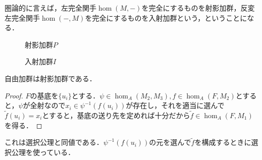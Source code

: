 圏論的に言えば，左完全関手$\hom(M,-)$を完全にするものを射影加群，反変左完全関手$\hom(-,M)$を完全にするものを入射加群という，ということになる．

\begin{minipage}{.45\hsize}
	\begin{figure}[H]
		\centering
		\caption{射影加群$P$}
	\end{figure}
\end{minipage}
\hfill
\begin{minipage}{.45\hsize}
	\begin{figure}[H]
		\centering
		\caption{入射加群$I$}
	\end{figure}
\end{minipage}

\begin{prop}\label{prop:自由加群は射影加群}
	自由加群は射影加群である．
\end{prop}
\begin{proof}
	$F$の基底を$\{u_i\}$とする．$\psi\in\hom_A(M_2,M_3),f\in\hom_A(F,M_2)$とすると，$\psi$が全射なので$x_i\in\psi^{-1}(f(u_i))$が存在し，それを適当に選んで$\widetilde{f}(u_i)=x_i$とすると，基底の送り先を定めれば十分だから$\widetilde{f}\in\hom_A(F,M_1)$を得る．
\end{proof}

これは選択公理と同値である．$\psi^{-1}(f(u_i))$の元を選んで$\widetilde{f}$を構成するときに選択公理を使っている．

